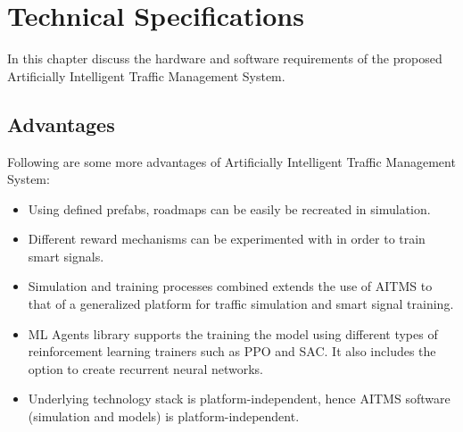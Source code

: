 \documentclass[openany,12pt]{report}
\begin{document}
		
	
	\chapter{Technical Specifications}
	\hspace*{0.5in}In this chapter discuss the hardware and software requirements of the proposed Artificially Intelligent Traffic Management System.
	
	
		\section{Advantages}
		Following are some more advantages of Artificially Intelligent Traffic Management System:
		\begin{itemize}
			\item{Using defined prefabs, roadmaps can be easily be recreated in simulation.}
			\item{Different reward mechanisms can be experimented with in order to train smart signals.}
			\item{Simulation and training processes combined extends the use of AITMS to that of a generalized platform for traffic simulation and smart signal training.}
			\item{ML Agents library supports the training the model using different types of reinforcement learning trainers such as PPO and SAC. It also includes the option to create recurrent neural networks. }
			\item{Underlying technology stack is platform-independent, hence AITMS software (simulation and models) is platform-independent.}	
		\end{itemize}
		

		\newpage
\end{document}
